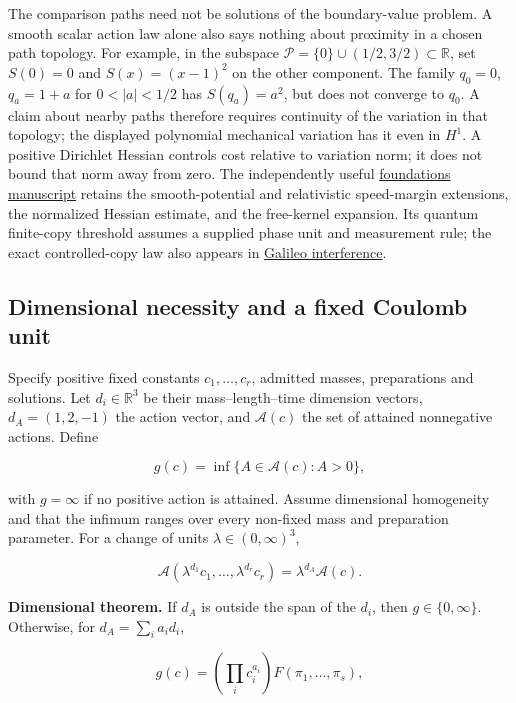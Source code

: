 \documentclass[11pt,a4paper]{article}
\begin{document}
The comparison paths need not be solutions of the boundary-value
problem. A smooth scalar action law alone also says nothing about
proximity in a chosen path topology. For example, in the subspace
\(\mathcal P=\{0\}\cup(1/2,3/2)\subset\mathbb R\), set \(S(0)=0\) and
\(S(x)=(x-1)^2\) on the other component. The family \(q_0=0\),
\(q_a=1+a\) for \(0<|a|<1/2\) has \(S(q_a)=a^2\), but does not converge
to \(q_0\). A claim about nearby paths therefore requires continuity of
the variation in that topology; the displayed polynomial mechanical
variation has it even in \(H^1\). A positive Dirichlet Hessian controls
cost relative to variation norm; it does not bound that norm away from
zero. The independently useful
\href{../papers/action-gap-foundations.tex}{foundations manuscript}
retains the smooth-potential and relativistic speed-margin extensions,
the normalized Hessian estimate, and the free-kernel expansion. Its
quantum finite-copy threshold assumes a supplied phase unit and
measurement rule; the exact controlled-copy law also appears in
\href{galileo-two-path-interference.md}{Galileo interference}.

\hypertarget{dimensional-necessity-and-a-fixed-coulomb-unit}{%
\subsection{Dimensional necessity and a fixed Coulomb
unit}\label{dimensional-necessity-and-a-fixed-coulomb-unit}}

Specify positive fixed constants \(c_1,\ldots,c_r\), admitted masses,
preparations and solutions. Let \(d_i\in\mathbb R^3\) be their
mass--length--time dimension vectors, \(d_A=(1,2,-1)\) the action
vector, and \(\mathcal A(c)\) the set of attained nonnegative actions.
Define

\[g(c)=\inf\{A\in\mathcal A(c):A>0\},\]

with \(g=\infty\) if no positive action is attained. Assume dimensional
homogeneity and that the infimum ranges over every non-fixed mass and
preparation parameter. For a change of units \(\lambda\in(0,\infty)^3\),

\[\mathcal A(\lambda^{d_1}c_1,\ldots,\lambda^{d_r}c_r)
 =\lambda^{d_A}\mathcal A(c).\]

\textbf{Dimensional theorem.} If \(d_A\) is outside the span of the
\(d_i\), then \(g\in\{0,\infty\}\). Otherwise, for
\(d_A=\sum_i a_i d_i\),

\[g(c)=\left(\prod_i c_i^{a_i}\right)F(\pi_1,\ldots,\pi_s),\]
\end{document}
